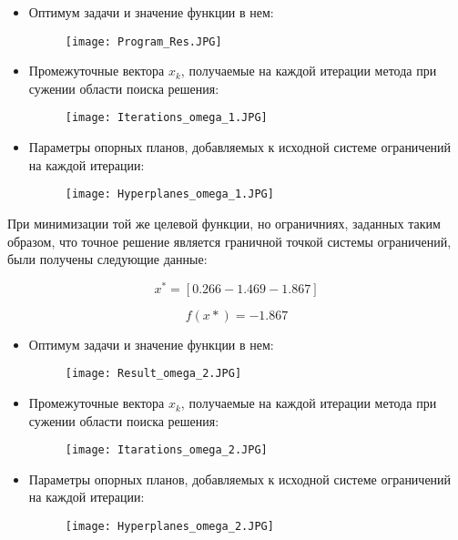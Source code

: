 \documentclass{article}
\begin{document}
    \begin{itemize}
        \item Оптимум задачи и значение функции в нем:
        \begin{figure}[H]
            \centering
            \texttt{[image: Program\_Res.JPG]}
        \end{figure}
        
        \item Промежуточные вектора $x_k$, получаемые на каждой итерации метода при сужении области поиска решения:
        \begin{figure}[H]
            \centering
            \texttt{[image: Iterations\_omega\_1.JPG]}
        \end{figure}
        
        \item Параметры опорных планов, добавляемых к исходной системе ограничений на каждой итерации:
        \begin{figure}[H]
            \centering
            \texttt{[image: Hyperplanes\_omega\_1.JPG]}
        \end{figure}
    \end{itemize}
    
\noindent При минимизации той же целевой функции, но ограничниях, заданных таким образом, что точное решение является граничной точкой системы ограничений, были получены следующие данные:
        
    \begin{equation*}
        x^{*} = [0.266 -1.469 -1.867]
    \end{equation*}
    
    \begin{equation*}
        f(x*) = -1.867
    \end{equation*}
    
    \begin{itemize}
        \item Оптимум задачи и значение функции в нем:
        \begin{figure}[H]
            \centering
            \texttt{[image: Result\_omega\_2.JPG]}
        \end{figure}
        
        \item Промежуточные вектора $x_k$, получаемые на каждой итерации метода при сужении области поиска решения:
        \begin{figure}[H]
            \centering
            \texttt{[image: Itarations\_omega\_2.JPG]}
        \end{figure}
        
        \item Параметры опорных планов, добавляемых к исходной системе ограничений на каждой итерации:
        
        \begin{figure}[H]
            \centering
            \texttt{[image: Hyperplanes\_omega\_2.JPG]}
        \end{figure}
    \end{itemize}
    
\end{document}
